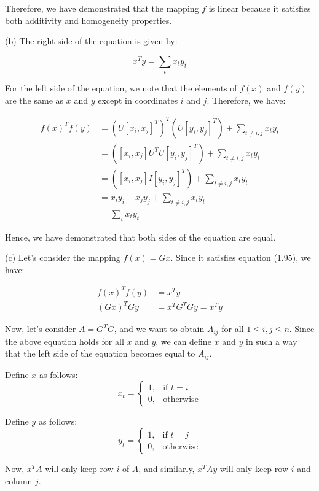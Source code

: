 \documentclass{article}
\begin{document}
\begin{enumerate}[leftmargin=\labelsep]
\begin{itemize}
Therefore, we have demonstrated that the mapping $f$ is linear because it satisfies both additivity and homogeneity properties.
\end{itemize}
(b) The right side of the equation is given by:

\[
x^T y = \sum_{t} x_t y_t
\]

For the left side of the equation, we note that the elements of \(f(x)\) and \(f(y)\) are the same as \(x\) and \(y\) except in coordinates \(i\) and \(j\). Therefore, we have:

\begin{align*}
f(x)^T f(y) &= \left(U[x_i, x_j]^T\right)^T \left(U[y_i, y_j]^T\right) + \sum_{t \neq i, j} x_t y_t \\
&= \left([x_i, x_j]U^T U [y_i, y_j]^T\right) + \sum_{t \neq i, j} x_t y_t \\
&= \left([x_i, x_j]I [y_i, y_j]^T\right) + \sum_{t \neq i, j} x_t y_t \\
&= x_i y_i + x_j y_j + \sum_{t \neq i, j} x_t y_t \\
&= \sum_{t} x_t y_t
\end{align*}

Hence, we have demonstrated that both sides of the equation are equal.

(c) Let's consider the mapping \(f(x) = Gx\). Since it satisfies equation (1.95), we have:

\begin{align*}
f(x)^T f(y) &= x^T y \\
(Gx)^T G y &= x^T G^T G y = x^T y
\end{align*}

Now, let's consider \(A = G^T G\), and we want to obtain \(A_{ij}\) for all \(1 \leq i, j \leq n\). Since the above equation holds for all \(x\) and \(y\), we can define \(x\) and \(y\) in such a way that the left side of the equation becomes equal to \(A_{ij}\). 

Define \(x\) as follows:
\[
x_t =
\begin{cases}
1, & \text{if } t = i \\
0, & \text{otherwise}
\end{cases}
\]

Define \(y\) as follows:
\[
y_t =
\begin{cases}
1, & \text{if } t = j \\
0, & \text{otherwise}
\end{cases}
\]

Now, \(x^T A\) will only keep row \(i\) of \(A\), and similarly, \(x^T A y\) will only keep row \(i\) and column \(j\).


\end{enumerate}
\end{document}
